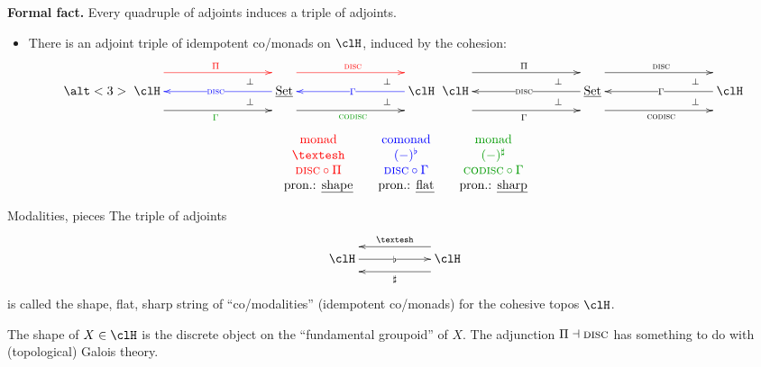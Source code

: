\documentclass[presentation]{beamer}
\begin{document}
\begin{frame}
  \begin{block}{}
    \textbf{Formal fact.} Every quadruple of adjoints induces a triple of adjoints.
  \end{block}
  \begin{itemize}
    \item<2-> There is an adjoint triple of idempotent co/monads on $\clH$, induced by the cohesion:
    \[
    \alt<3>{
    \xymatrix@C=3cm{
    \clH
    \ar@{}@<8pt>[r]|(.75)\perp
    \ar@{}@<-8pt>[r]|(.75)\perp
    \ar@[red]@<15pt>[r]^{\color{red}\Pi}
    \ar@[blue]@{<-}[r]|{\color{blue}\disc}
    \ar@[green!60!black]@<-15pt>[r]_{\color{green!60!black}\Gamma}
    &
    \Set
    \ar@{}@<8pt>[r]|(.75)\perp
    \ar@{}@<-8pt>[r]|(.75)\perp
    \ar@[red]@<15pt>[r]^{\color{red}\disc}
    \ar@[blue]@{<-}[r]|{\color{blue}\Gamma}
    \ar@[green!60!black]@<-15pt>[r]_{\color{green!60!black}\codisc}
    &
    \clH}
    }{\xymatrix@C=3cm{
    \clH
    \ar@{}@<8pt>[r]|(.75)\perp
    \ar@{}@<-8pt>[r]|(.75)\perp
    \ar@<15pt>[r]^\Pi
    \ar@{<-}[r]|\disc
    \ar@<-15pt>[r]_\Gamma &
    \Set
    \ar@{}@<8pt>[r]|(.75)\perp
    \ar@{}@<-8pt>[r]|(.75)\perp
    \ar@<15pt>[r]^\disc
    \ar@{<-}[r]|\Gamma
    \ar@<-15pt>[r]_\codisc & \clH
    }}
    \]
    \[
    \begin{array}{ccccc}
      {\color{red}\text{monad}}    &  &
      {\color{blue}\text{comonad}} &  &
      {\color{green!60!black}\text{monad}}                                           \\
      
      {\color{red}\shape}          &  &
      {\color{blue}(-)^\flat}      &  &
      {\color{green!60!black}(-)^\sharp}                                             \\
      
      {\color{red}\disc\circ\Pi}
      &  & {\color{blue}\disc\circ\Gamma} &  &
      {\color{green!60!black}\codisc\circ\Gamma}                                     \\
      
      \text{pron.: \emph{shape}}   &  &
      \text{pron.: \emph{flat}}    &  &
      \text{pron.: \emph{sharp}}
    \end{array}
    \]
  \end{itemize}
\end{frame}
%
%
%
%
%
%
%
\begin{frame}{Modalities, pieces}
  The triple of adjoints
  \[
  \xymatrix@C=2cm{
  \clH
  \ar[r]|\flat
  \ar@{<-}@<10pt>[r]^\shape
  \ar@{<-}@<-10pt>[r]_\sharp &
  \clH
  }
  \]
  is called the \alert{shape, flat, sharp} string of ``co/modalities'' (idempotent co/monads) for the cohesive topos $\clH$.
  
  The \alert{shape} of $X \in\clH$ is the discrete object on the ``fundamental groupoid'' of $X$. The adjunction $\Pi\dashv\textsc{disc}$ has something to do with (topological) Galois theory.
\end{frame}
\end{document}
